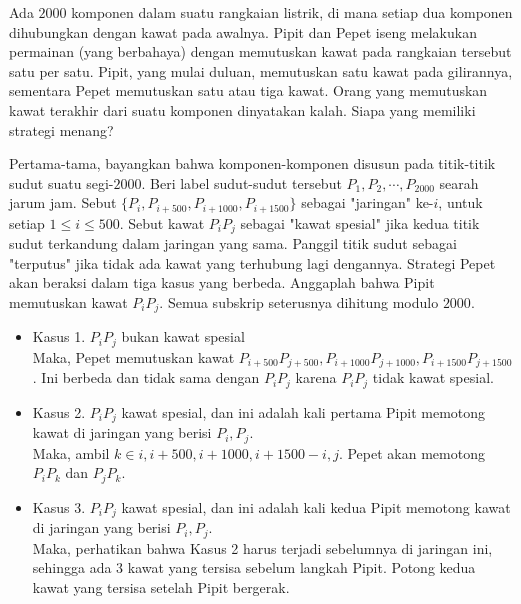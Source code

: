 \documentclass[11pt]{scrartcl}
\begin{document}
\begin{soaljawab}
Ada $2000$ komponen dalam suatu rangkaian listrik, di mana setiap dua komponen dihubungkan dengan kawat pada awalnya. Pipit dan Pepet iseng melakukan permainan (yang berbahaya) dengan memutuskan kawat pada rangkaian tersebut satu per satu. Pipit, yang mulai duluan, memutuskan satu kawat pada gilirannya, sementara Pepet memutuskan satu atau tiga kawat. Orang yang memutuskan kawat terakhir dari suatu komponen dinyatakan kalah. Siapa yang memiliki strategi menang?
    \begin{solusi}
        Pertama-tama, bayangkan bahwa komponen-komponen disusun pada titik-titik sudut suatu segi-$2000$. Beri label sudut-sudut tersebut $P_1, P_2, \cdots, P_{2000}$ searah jarum jam. Sebut $\{P_i, P_{i+500}, P_{i + 1000}, P_{i+1500}\}$ sebagai "jaringan" ke-$i$, untuk setiap $1 \le i \le 500$. Sebut kawat $P_iP_j$ sebagai "kawat spesial" jika kedua titik sudut terkandung dalam jaringan yang sama. Panggil titik sudut sebagai "terputus" jika tidak ada kawat yang terhubung lagi dengannya. Strategi Pepet akan beraksi dalam tiga kasus yang berbeda. Anggaplah bahwa Pipit memutuskan kawat $P_iP_j$. Semua subskrip seterusnya dihitung modulo $2000$.
        
        \begin{itemize}
            \item Kasus 1. $P_iP_j$ bukan kawat spesial\\
            Maka, Pepet memutuskan kawat $P_{i+500}P_{j+500}, P_{i+1000}P_{j+1000}, P_{i+1500}P_{j+1500}$. Ini berbeda dan tidak sama dengan $P_iP_j$ karena $P_iP_j$ tidak kawat spesial.

            \item Kasus 2. $P_iP_j$ kawat spesial, dan ini adalah kali pertama Pipit memotong kawat di jaringan yang berisi $P_i, P_j$.\\
            Maka, ambil $k \in {i, i+500, i+1000, i+1500} - {i, j}$. Pepet akan memotong $P_iP_k$ dan $P_j P_k$.

            \item Kasus 3. $P_iP_j$ kawat spesial, dan ini adalah kali kedua Pipit memotong kawat di jaringan yang berisi $P_i, P_j$.\\
            Maka, perhatikan bahwa Kasus 2 harus terjadi sebelumnya di jaringan ini, sehingga ada $3$ kawat yang tersisa sebelum langkah Pipit. Potong kedua kawat yang tersisa setelah Pipit bergerak.
        \end{itemize}


\end{solusi}
\end{soaljawab}
\end{document}
